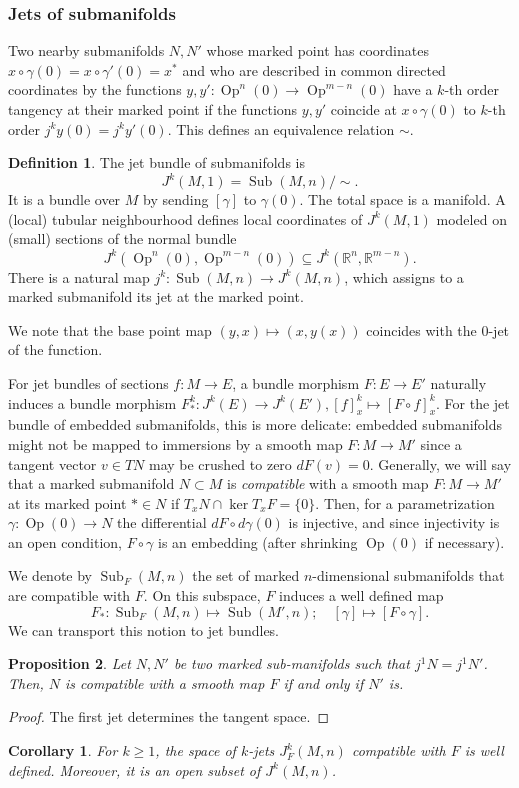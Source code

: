 \documentclass{amsart}
\newcommand{\RR}{\mathbb{R}}
\newcommand{\sub}{\operatorname{Sub}}
\newcommand{\Sub}{\operatorname{Sub}}
\newcommand{\Op}{\operatorname{Op}}
\newtheorem{proposition}{Proposition}[section]
\newtheorem{corollary}[theorem]{Corollary}
\theoremstyle{definition}
\newtheorem{definition}[proposition]{Definition}
\theoremstyle{remark}
\numberwithin{equation}{section}
\begin{document}
\subsubsection{Jets of submanifolds} \label{subsubsec:JetsOfSubmanifolds}
Two nearby submanifolds $N,N'$ whose marked point has coordinates $x\circ\gamma(0)=x\circ\gamma'(0)=x^*$ and who are described in common directed coordinates by the functions $y,y':\Op^n(0)\to\Op^{m-n}(0)$ have a $k$-th order tangency at their marked point if the functions $y,y'$ coincide at $x\circ\gamma(0)$ to $k$-th order $j^ky(0)=j^ky'(0)$. This defines an equivalence relation $\sim$.
\begin{definition}
    The jet bundle of submanifolds is
    $$J^k(M,1) = \sub(M,n)/\sim.$$ 
    It is a bundle over $M$ by sending $[\gamma]$ to $\gamma(0)$. The total space is a manifold. A (local) tubular neighbourhood defines local coordinates of $J^k(M,1)$ modeled on (small) sections of the normal bundle $$J^k(\Op^n(0),\Op^{m-n}(0))\subseteq J^k(\RR^n,\RR^{m-n}).$$
    There is a natural map $j^k:\sub(M,n)\to J^k(M,n)$, which assigns to a marked submanifold its jet at the marked point. 
\end{definition}

We note that the base point map $(y,x)\mapsto (x,y(x))$ coincides with the 0-jet of the function. 

For jet bundles of sections $f:M\to E$, a bundle morphism $F:E\to E'$  naturally induces a bundle morphism $F^k_*:J^k(E)\to J^k(E'), [f]_x^k\mapsto [F\circ f]^k_{x}$. For the jet bundle of embedded submanifolds, this is more delicate: embedded submanifolds might not be mapped to immersions by a smooth map $F:M\to M'$ since a tangent vector $v\in TN$ may be crushed to zero $dF(v)=0$. Generally, we will say that a marked submanifold $N\subset M$ is \emph{compatible} with a smooth map $F:M\to M'$ at its marked point $*\in N$ if $T_xN\cap \ker T_xF=\{0\}$. Then, for a parametrization $\gamma:\Op(0)\to N$ the differential  $dF\circ d\gamma(0)$ is injective, and since injectivity is an open condition, $F\circ \gamma$ is an embedding (after shrinking $\Op(0)$ if necessary).

We denote by $\Sub_F(M,n)$ the set of marked $n$-dimensional submanifolds that are compatible with $F$. On this subspace, $F$ induces a well defined map
$$F_*:\Sub_F(M,n)\mapsto \Sub(M',n);\quad [\gamma]\mapsto [F\circ\gamma].$$
We can transport this notion to jet bundles.
\begin{proposition}
    Let $N,N'$ be two marked sub-manifolds such that $j^1N=j^1N'$. Then, $N$ is compatible with a smooth map $F$ if and only if $N'$ is.
\end{proposition}
\begin{proof}
    The first jet determines the tangent space.
\end{proof}
\begin{corollary}
    For $k\geq 1$, the space of $k$-jets $J^k_F(M,n)$ compatible with $F$ is well defined. Moreover, it is an open subset of $J^k(M,n)$.
\end{corollary}
\end{document}
